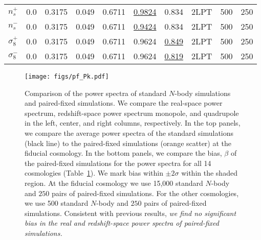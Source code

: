 \documentclass[12pt, letterpaper, preprint]{aastex62}
\begin{document}
\begin{table}
\begin{center}
\begin{tabular}{cccccccccc}
    $n_s^+$         & 0.0   & 0.3175 & 0.049 & 0.6711 & \underline{0.9824} & 0.834 & 2LPT & 500 & 250\\ 
    $n_s^-$         & 0.0   & 0.3175 & 0.049 & 0.6711 & \underline{0.9424} & 0.834 & 2LPT & 500 & 250\\ 
    $\sigma_8^+$    & 0.0   & 0.3175 & 0.049 & 0.6711 & 0.9624 & \underline{0.849} & 2LPT & 500 & 250\\ 
    $\sigma_8^-$    & 0.0   & 0.3175 & 0.049 & 0.6711 & 0.9624 & \underline{0.819} & 2LPT & 500 & 250\\[3pt]
    \hline
    \end{tabular} \label{tab:sims}
    \end{center}
\end{table}


\begin{figure}
\begin{center}
    \texttt{[image: figs/pf\_Pk.pdf]} 
    \caption{Comparison of the power spectra of standard $N$-body simulations 
    and paired-fixed simulations. We compare the real-space power spectrum, 
    redshift-space power spectrum monopole, and quadrupole in the left, center, 
    and right columns, respectively. In the top panels, we compare the average 
    power spectra of the standard simulations (black line) to the paired-fixed
    simulations (orange scatter) at the fiducial cosmology. In the bottom panels, 
    we compare the bias, $\beta$ of the paired-fixed simulations for the power 
    spectra for all 14 cosmologies (Table~\ref{tab:sims}). We mark bias within 
    $\pm2\sigma$ within the shaded region. At the fiducial 
    cosmology we use 15,000 standard $N$-body and $250$ pairs of paired-fixed 
    simulations. For the other cosmologies, we use 500 standard $N$-body and $250$ pairs 
    of paired-fixed simulations. Consistent with previous results, {\em we find no
    significant bias in the real and redshift-space power spectra of paired-fixed
    simulations.}
    }
\label{fig:pk}
\end{center}
\end{figure}
\end{document}
